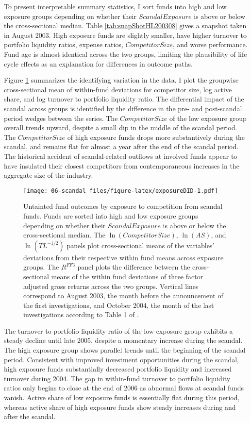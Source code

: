 \documentclass[openany]{book}
\theoremstyle{definition}
\theoremstyle{definition}
\theoremstyle{definition}
\theoremstyle{remark}
\begin{document}
To present interpretable summary statistics, I sort funds into high and
low exposure groups depending on whether their \(ScandalExposure\) is
above or below the cross-sectional median. Table
\ref{tab:snapShotHL200308} gives a snapshot taken in August 2003. High
exposure funds are slightly smaller, have higher turnover to portfolio
liquidity ratios, expense ratios, \(CompetitorSize\), and worse
performance. Fund age is almost identical across the two groups,
limiting the plausibility of life cycle effects as an explanation for
differences in outcome paths.

Figure \ref{fig:exposureDID} summarizes the identifying variation in the
data. I plot the groupwise cross-sectional mean of within-fund
deviations for competitor size, log active share, and log turnover to
portfolio liquidity ratio. The differential impact of the scandal across
groups is identified by the difference in the pre- and post-scandal
period wedges between the series. The \(CompetitorSize\) of the low
exposure group overall trends upward, despite a small dip in the middle
of the scandal period. The \(CompetitorSize\) of high exposure funds
drops more substantively during the scandal, and remains flat for almost
a year after the end of the scandal period. The historical accident of
scandal-related outflows at involved funds appear to have insulated
their closest competitors from contemporaneous increases in the
aggregate size of the industry.

\begin{figure}
\centering
\texttt{[image: 06-scandal\_files/figure-latex/exposureDID-1.pdf]}
\caption{\label{fig:exposureDID}Untainted fund outcomes by exposure to
competition from scandal funds. Funds are sorted into high and low
exposure groups depending on whether their \(ScandalExposure\) is above
or below the cross-sectional median. The \(\ln(CompetitorSize)\),
\(\ln(AS)\), and \(\ln(TL^{-1/2})\) panels plot cross-sectional means of
the variables' deviations from their respective within fund means across
exposure groups. The \(R^{FF3}\) panel plots the difference between the
cross-sectional means of the within fund deviations of three factor
adjusted gross returns across the two groups. Vertical lines correspond
to August 2003, the month before the announcement of the first
investigations, and October 2004, the month of the last investigations
according to Table 1 of \citet{hw05}.}
\end{figure}

The turnover to portfolio liquidity ratio of the low exposure group
exhibits a steady decline until late 2005, despite a momentary increase
during the scandal. The high exposure group shows parallel trends until
the beginning of the scandal period. Consistent with improved investment
opportunities during the scandal, high exposure funds substantially
decreased portfolio liquidity and increased turnover during 2004. The
gap in within-fund turnover to portfolio liquidity ratios only begins to
close at the end of 2006 as abnormal flows at scandal funds vanish.
Active share of low exposure funds is essentially flat during this
period, whereas active share of high exposure funds show steady
increases during and after the scandal.
\end{document}

